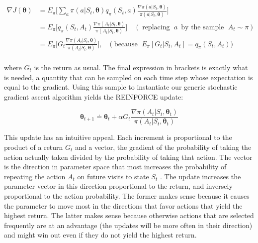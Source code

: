 \documentclass{article}
\begin{document}
$$
\begin{aligned} { \nabla J ( \pmb { \theta } ) } & { { } = E _ { \pi } \Bigg [ \sum _ { a } \pi ( a | S _ { t } , \pmb { \theta } ) q _ { \pi } ( S _ { t } , a ) \frac { \nabla \pi ( a | S _ { t } , \pmb { \theta } ) } { \pi ( a | S _ { t } , \pmb { \theta } ) } \Bigg ] } \\ { } & { { } = E _ { \pi } \Bigg [ q _ { \pi } ( S _ { t } , A _ { t } ) \frac { \nabla \pi ( A _ { t } | S _ { t } , \pmb { \theta } ) } { \pi ( A _ { t } | S _ { t } , \pmb { \theta } ) } \Bigg ] \quad { ( \operatorname { r e p l a c i n g ~ } a ~ \operatorname { b y ~ t h e ~ s a m p l e ~ } A _ t \sim \pi ) } } \\ { } & { { } = E _ { \pi } \Bigg [ G _ { t } \frac { \nabla \pi ( A _ { t } | S _ { t } , \pmb { \theta } ) } { \pi ( A _ { t } | S _ { t } , \pmb { \theta } ) } \Bigg ] , \quad { ( \operatorname { b e c a u s e ~ } } E _ { \pi } [ G _ { t } | S _ { t } , A _ { t } ] = q _ { \pi } ( S _ { t } , A _ { t } ) ) } \\ \end{aligned}
$$

where $G _ { t }$ is the return as usual. The final expression in brackets is exactly what is needed, a quantity that can be sampled on each time step whose expectation is equal to the gradient. Using this sample to instantiate our generic stochastic gradient ascent algorithm yields the REINFORCE update:

$$
\pmb { \theta } _ { t + 1 } \doteq \pmb { \theta } _ { t } + \alpha \mathbf { \mathit { G } } _ { t } \frac { \nabla \pi ( A _ { t } | S _ { t } , \pmb { \theta } _ { t } ) } { \pi ( A _ { t } | S _ { t } , \pmb { \theta } _ { t } ) }
$$

This update has an intuitive appeal. Each increment is proportional to the product of a return $G _ { t }$ and a vector, the gradient of the probability of taking the action actually taken divided by the probability of taking that action. The vector is the direction in parameter space that most increases the probability of repeating the action $A _ { t }$ 
on future visits to state $S _ { t }$ . The update increases the parameter vector in this direction proportional to the return, and inversely proportional to the action probability. The former makes sense because it causes the parameter to move most in the directions that favor actions that yield the highest return. The latter makes sense because otherwise actions 
that are selected frequently are at an advantage (the updates will be more often in their direction) and might win out even if they do not yield the highest return.
\end{document}
